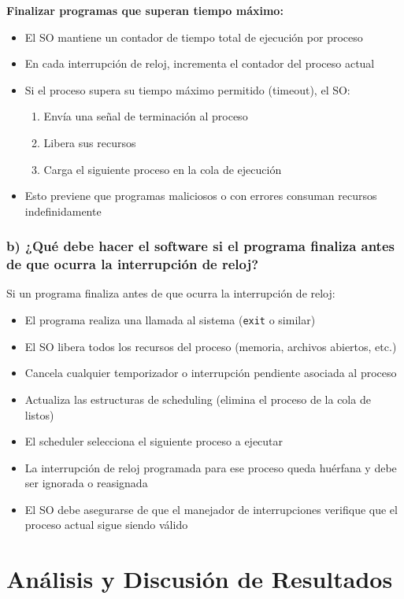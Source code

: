 \documentclass[12pt]{article}
\begin{document}
\textbf{Finalizar programas que superan tiempo máximo:}
\begin{itemize}
	\item El SO mantiene un contador de tiempo total de ejecución por proceso
	\item En cada interrupción de reloj, incrementa el contador del proceso actual
	\item Si el proceso supera su tiempo máximo permitido (timeout), el SO:
	\begin{enumerate}
		\item Envía una señal de terminación al proceso
		\item Libera sus recursos
		\item Carga el siguiente proceso en la cola de ejecución
	\end{enumerate}
	\item Esto previene que programas maliciosos o con errores consuman recursos indefinidamente
\end{itemize}

\subsubsection{b) ¿Qué debe hacer el software si el programa finaliza antes de que ocurra la interrupción de reloj?}

Si un programa finaliza antes de que ocurra la interrupción de reloj:
\begin{itemize}
	\item El programa realiza una llamada al sistema (\texttt{exit} o similar)
	\item El SO libera todos los recursos del proceso (memoria, archivos abiertos, etc.)
	\item Cancela cualquier temporizador o interrupción pendiente asociada al proceso
	\item Actualiza las estructuras de scheduling (elimina el proceso de la cola de listos)
	\item El scheduler selecciona el siguiente proceso a ejecutar
	\item La interrupción de reloj programada para ese proceso queda huérfana y debe ser ignorada o reasignada
	\item El SO debe asegurarse de que el manejador de interrupciones verifique que el proceso actual sigue siendo válido
\end{itemize}

\section{Análisis y Discusión de Resultados}
\end{document}
